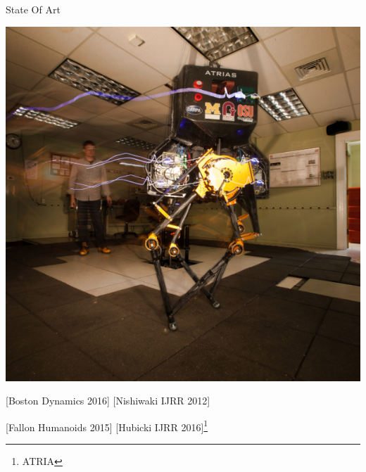\begin{frame}{State Of Art}
\begin{center}
\hspace*{0.3cm}
\includegraphics[trim={1.5cm 0.0cm 1.0cm 0.0cm}, clip,
height=0.4\textheight , keepaspectratio]
{figures/stateoftheart/what-is-atrias.png}

\end{center}
\vspace*{-0.5cm}
[Boston Dynamics 2016] \hspace*{1.7cm} [Nishiwaki IJRR 2012]

\hspace*{2.8cm} [Fallon Humanoids 2015] \hspace*{1.3cm} [Hubicki IJRR 2016]\footnote{ATRIA}

\end{frame}